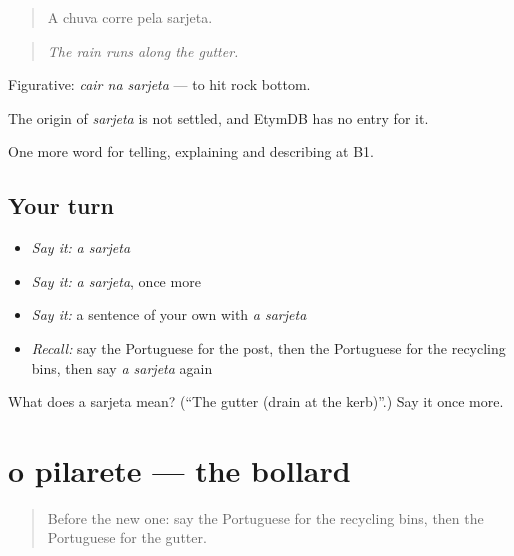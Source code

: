 \begin{quote}
A chuva corre pela sarjeta.
\end{quote}

\begin{quote}
\emph{The rain runs along the gutter.}
\end{quote}

Figurative: \emph{cair na sarjeta} — to hit rock bottom.

\begin{cousinweb}
The origin of \emph{sarjeta} is not settled, and EtymDB has no entry for it.
\end{cousinweb}

\begin{grammarlens}[title={What you've built}]
One more word for telling, explaining and describing at B1.
\end{grammarlens}

\subsection*{Your turn}
\begin{itemize}
\raggedright
  \item \emph{Say it:} \emph{a sarjeta}
  \item \emph{Say it:} \emph{a sarjeta}, once more
  \item \emph{Say it:} a sentence of your own with \emph{a sarjeta}
  \item \emph{Recall:} say the Portuguese for the post, then the Portuguese for the recycling bins, then say \emph{a sarjeta} again
\end{itemize}

\begin{tcolorbox}[breakable,colback=teal!4,colframe=teal!35!black,title={Before you move on}]
What does a sarjeta mean? (\textquotedblleft{}The gutter (drain at the kerb)\textquotedblright{}.) Say it once more.
\end{tcolorbox}
\section[o pilarete]{o pilarete — the bollard}

\label{lesson:PT-C444-pilarete}



\begin{quote}
Before the new one: say the Portuguese for the recycling bins, then the Portuguese for the gutter.
\end{quote}

